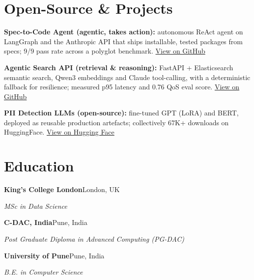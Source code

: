 \documentclass[10pt,a4paper]{article}
\begin{document}
\section{Open-Source \& Projects}
\begin{tight}
  \item \textbf{Spec-to-Code Agent (agentic, takes action):} autonomous ReAct agent on LangGraph and the Anthropic API that ships installable, tested packages from specs; 9/9 pass rate across a polyglot benchmark. \href{https://github.com/abhijeetscode/Spec-to-Code-Agent}{View on GitHub}
  \item \textbf{Agentic Search API (retrieval \& reasoning):} FastAPI + Elasticsearch semantic search, Qwen3 embeddings and Claude tool-calling, with a deterministic fallback for resilience; measured p95 latency and 0.76 QoS eval score. \href{https://github.com/abhijeetscode/search-agent}{View on GitHub}
  \item \textbf{PII Detection LLMs (open-source):} fine-tuned GPT (LoRA) and BERT, deployed as reusable production artefacts; collectively 67K+ downloads on HuggingFace. \href{https://huggingface.co/ab-ai/pii_model}{View on Hugging Face}
\end{tight}

\section{Education}
{\color{company}\bfseries King's College London}\hfill {\color{muted}London, UK}\par
{\itshape MSc in Data Science}\par\vspace{2pt}
{\color{company}\bfseries C-DAC, India}\hfill {\color{muted}Pune, India}\par
{\itshape Post Graduate Diploma in Advanced Computing (PG-DAC)}\par\vspace{2pt}
{\color{company}\bfseries University of Pune}\hfill {\color{muted}Pune, India}\par
{\itshape B.E. in Computer Science}\par
\end{document}
